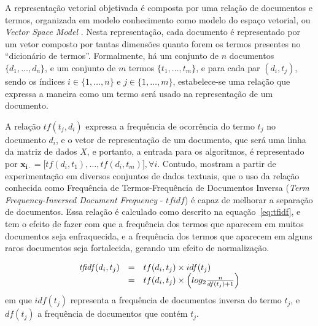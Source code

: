\documentclass[
    12pt,                %
    oneside,            %
    a4paper,            %
    english,            %
    brazil                %
    ]{abntex2ppgsi}
\begin{document}

A representação vetorial objetivada é composta por uma relação de documentos e termos, organizada em modelo conhecimento como modelo do espaço vetorial, ou \textit{Vector Space Model} \cite{Salton1975,Sebastiani2002,Lops2011}.
Nesta representação, cada documento é representado por um vetor composto por tantas dimensões quanto forem os termos presentes no ``dicionário de termos''.
Formalmente, há um conjunto de $n$ documentos $\{ d_1, \dots, d_n \}$, e um conjunto de $m$ termos $\{ t_1, \dots, t_m \}$, e para cada par $(d_i, t_j)$, sendo os índices $i \in \{1, \dots, n\}$ e $j \in \{1, \dots, m\}$, estabelece-se uma relação que expressa a maneira como um termo será usado na representação de um documento.

A relação $\textit{tf}(t_j, d_i)$ expressa a frequência de ocorrência do termo $t_j$ no documento $d_i$, e o vetor de representação de um documento, que será uma linha da matriz de dados $X$, e portanto, a entrada para os algoritmos, é representado por $\mathbf{\mathbf{x}_{i \cdot}} = \big[ \textit{tf}(d_i, t_1), \dots, \textit{tf}(d_i, t_m) \big], \forall i$.
Contudo,  mostram a partir de experimentação em diversos conjuntos de dados textuais, que o uso da relação conhecida como Frequência de Termos-Frequência de Documentos Inversa (\textit{Term Frequency-Inversed Document Frequency} - $\textit{tfidf}$) é capaz de melhorar a separação de documentos.
Essa relação é calculado como descrito na equação~\ref{eq:tfidf}, e tem o efeito de fazer com que a frequência dos termos que aparecem em muitos documentos seja enfraquecida, e a frequência dos termos que aparecem em alguns raros documentos seja fortalecida, gerando um efeito de normalização.

\begin{equation}
\label{eq:tfidf}
    \begin{array}{lclcl}
        \text{\textit{tfidf}}(d_i, t_j) & = & tf(d_i, t_j) \times idf(t_j) \\
                                        & = & tf(d_i, t_j) \times \left( log_{2} \frac{n}{df(t_j) + 1} \right) \\
    \end{array}
\end{equation}
em que $idf(t_j)$ representa a frequência de documentos inversa do termo $t_j$, e $df(t_j)$ a frequência de documentos que contém $t_j$.
\end{document}
